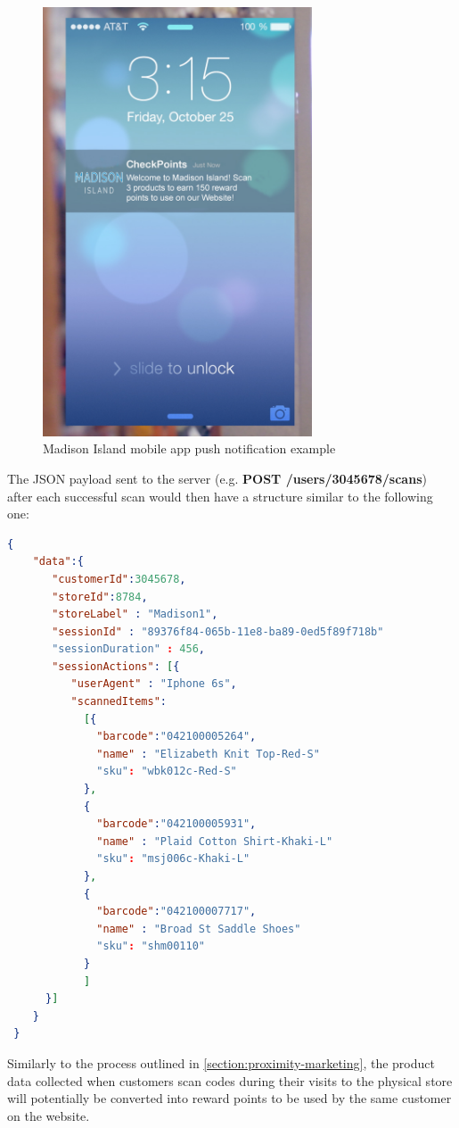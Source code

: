 \vspace{0.5cm}
\begin{figure}[H]
  \centering
    \includegraphics[width=8cm]{images/madison-push-reward-points.jpg}
  \caption{Madison Island mobile app push notification example}
  \label{fig:mobile-app-push-notification}
\end{figure}
\vspace{0.5cm}


The JSON payload sent to the server (e.g. \textbf{POST /users/3045678/scans}) after each successful scan would then have a structure similar to the following one:
 
\vspace{0.5cm}
\begin{lstlisting}[language=json,firstnumber=1]
  {
    "data":{
       "customerId":3045678,
       "storeId":8784,
       "storeLabel" : "Madison1",
       "sessionId" : "89376f84-065b-11e8-ba89-0ed5f89f718b"
       "sessionDuration" : 456,
       "sessionActions": [{
          "userAgent" : "Iphone 6s",
          "scannedItems":
            [{
              "barcode":"042100005264",
              "name" : "Elizabeth Knit Top-Red-S"
              "sku": "wbk012c-Red-S"    
            },
            {
              "barcode":"042100005931",
              "name" : "Plaid Cotton Shirt-Khaki-L"
              "sku": "msj006c-Khaki-L"    
            },
            {
              "barcode":"042100007717",
              "name" : "Broad St Saddle Shoes"
              "sku": "shm00110"    
            }
            ]
      }]
    }
 }
  \end{lstlisting}
\vspace{0.5cm}


Similarly to the process outlined in \ref{section:proximity-marketing}, the product data collected when customers scan codes during their visits to the physical store will potentially be converted into reward points to be used by the same customer on the website.  

